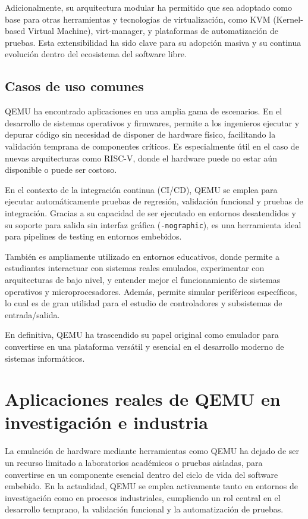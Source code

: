 Adicionalmente, su arquitectura modular ha permitido que sea adoptado como base para otras herramientas y tecnologías de virtualización, como KVM (Kernel-based Virtual Machine), virt-manager, y plataformas de automatización de pruebas. Esta extensibilidad ha sido clave para su adopción masiva y su continua evolución dentro del ecosistema del software libre.

\subsection{Casos de uso comunes}

QEMU ha encontrado aplicaciones en una amplia gama de escenarios. En el desarrollo de sistemas operativos y firmwares, permite a los ingenieros ejecutar y depurar código sin necesidad de disponer de hardware físico, facilitando la validación temprana de componentes críticos. Es especialmente útil en el caso de nuevas arquitecturas como RISC-V, donde el hardware puede no estar aún disponible o puede ser costoso.

En el contexto de la integración continua (CI/CD), QEMU se emplea para ejecutar automáticamente pruebas de regresión, validación funcional y pruebas de integración. Gracias a su capacidad de ser ejecutado en entornos desatendidos y su soporte para salida sin interfaz gráfica (\texttt{-nographic}), es una herramienta ideal para pipelines de testing en entornos embebidos.

También es ampliamente utilizado en entornos educativos, donde permite a estudiantes interactuar con sistemas reales emulados, experimentar con arquitecturas de bajo nivel, y entender mejor el funcionamiento de sistemas operativos y microprocesadores. Además, permite simular periféricos específicos, lo cual es de gran utilidad para el estudio de controladores y subsistemas de entrada/salida.

En definitiva, QEMU ha trascendido su papel original como emulador para convertirse en una plataforma versátil y esencial en el desarrollo moderno de sistemas informáticos.

\section{Aplicaciones reales de QEMU en investigación e industria}
\label{sec:estado-arte-industria}

La emulación de hardware mediante herramientas como QEMU ha dejado de ser un recurso limitado a laboratorios académicos o pruebas aisladas, para convertirse en un componente esencial dentro del ciclo de vida del software embebido. En la actualidad, QEMU se emplea activamente tanto en entornos de investigación como en procesos industriales, cumpliendo un rol central en el desarrollo temprano, la validación funcional y la automatización de pruebas.

